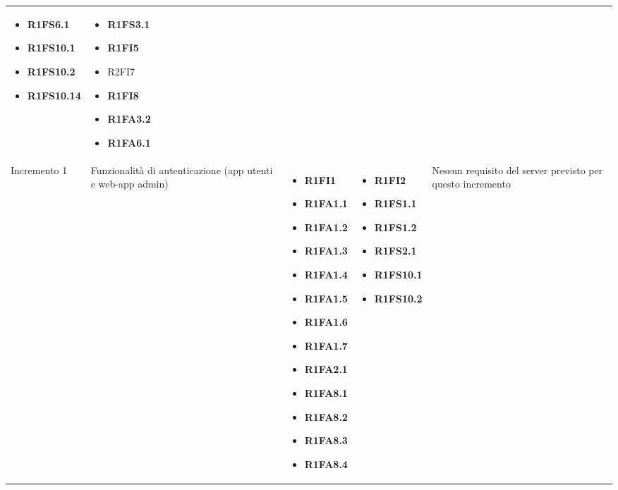 {\begin{longtable}{C{2.5cm} C{3.2cm} C{2.8cm} C{2.8cm} C{2.8cm}}
\begin{itemize}
    \item[ ] \textbf{R1FS6.1}
    \item[ ] \textbf{R1FS10.1}
    \item[ ] \textbf{R1FS10.2} 
    \item[ ] \textbf{R1FS10.14}
\end{itemize} & \begin{itemize} 
    \item[ ] \textbf{R1FS3.1}
    \item[ ] \textbf{R1FI5}
    \item[ ] R2FI7
    \item[ ] \textbf{R1FI8}
    \item[ ] \textbf{R1FA3.2}
    \item[ ] \textbf{R1FA6.1}

\end{itemize}\\

Incremento 1 & Funzionalità di autenticazione (app utenti e web-app admin) & \begin{itemize}
    \item[ ] \textbf{R1FI1}
    \item[ ] \textbf{R1FA1.1}
    \item[ ] \textbf{R1FA1.2}
    \item[ ] \textbf{R1FA1.3}
    \item[ ] \textbf{R1FA1.4}
    \item[ ] \textbf{R1FA1.5}
    \item[ ] \textbf{R1FA1.6}
    \item[ ] \textbf{R1FA1.7}
    \item[ ] \textbf{R1FA2.1}
    \item[ ] \textbf{R1FA8.1}
    \item[ ] \textbf{R1FA8.2}
    \item[ ] \textbf{R1FA8.3}
    \item[ ] \textbf{R1FA8.4}
\end{itemize} & \begin{itemize} 
    \item[ ] \textbf{R1FI2}
    \item[ ] \textbf{R1FS1.1}
    \item[ ] \textbf{R1FS1.2}
    \item[ ] \textbf{R1FS2.1}
    \item[ ] \textbf{R1FS10.1}
    \item[ ] \textbf{R1FS10.2}
\end{itemize} & 
    Nessun requisito del server previsto per questo incremento \\


\end{longtable}}
